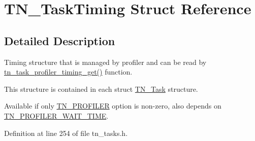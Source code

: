 \hypertarget{structTN__TaskTiming}{}\section{T\+N\+\_\+\+Task\+Timing Struct Reference}
\label{structTN__TaskTiming}


\subsection{Detailed Description}
Timing structure that is managed by profiler and can be read by {\ttfamily \hyperlink{tn__tasks_8h_a8f90a88f54d2d49bb1de00886241edfe}{tn\+\_\+task\+\_\+profiler\+\_\+timing\+\_\+get()}} function. 

This structure is contained in each {\ttfamily struct \hyperlink{structTN__Task}{T\+N\+\_\+\+Task}} structure.

Available if only {\ttfamily \hyperlink{tn__cfg__default_8h_a49a546b18cc1f75b51d4cf8b290634dd}{T\+N\+\_\+\+P\+R\+O\+F\+I\+L\+ER}} option is non-\/zero, also depends on {\ttfamily \hyperlink{tn__cfg__default_8h_a1c04db5457adb54f7cc38d42b29a5ad7}{T\+N\+\_\+\+P\+R\+O\+F\+I\+L\+E\+R\+\_\+\+W\+A\+I\+T\+\_\+\+T\+I\+ME}}. 

Definition at line 254 of file tn\+\_\+tasks.\+h.

